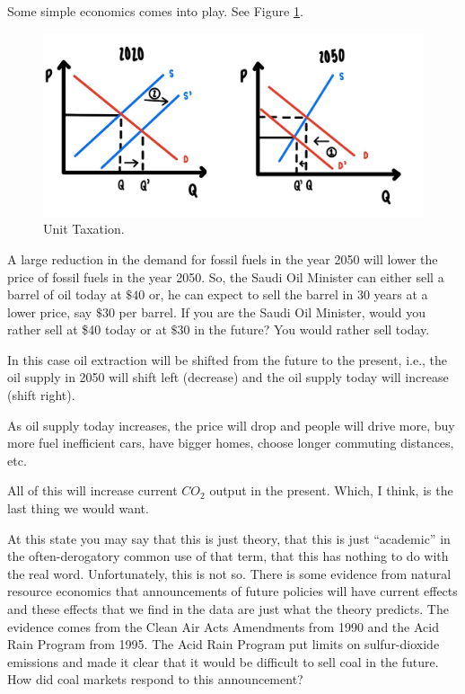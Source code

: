 \documentclass[
]{book}
\begin{document}
Some simple economics comes into play. See Figure \ref{fig:compmarkets08}.

\begin{figure}

{\centering \includegraphics[width=0.9\linewidth]{img/compmarkets/fig8} 

}

\caption{Unit Taxation.}\label{fig:compmarkets08}
\end{figure}

A large reduction in the demand for fossil fuels in the year 2050 will lower the price of fossil fuels in the year 2050. So, the Saudi Oil Minister can either sell a barrel of oil today at \(\$40\) or, he can expect to sell the barrel in 30 years at a lower price, say \(\$30\) per barrel. If you are the Saudi Oil Minister, would you rather sell at \$40 today or at \(\$30\) in the future?
You would rather sell today.

In this case oil extraction will be shifted from the future to the present, i.e., the oil supply in 2050 will shift left (decrease) and the oil supply today will increase (shift right).

As oil supply today increases, the price will drop and people will drive more, buy more fuel inefficient cars, have bigger homes, choose longer commuting distances, etc.

All of this will increase current \(CO_2\) output in the present. Which, I think, is the last thing we would want.

At this state you may say that this is just theory, that this is just ``academic'' in the often-derogatory common use of that term, that this has nothing to do with the real word. Unfortunately, this is not so. There is some evidence from natural resource economics that announcements of future policies will have current effects and these effects that we find in the data are just what the theory predicts. The evidence comes from the Clean Air Acts Amendments from 1990 and the Acid Rain Program from 1995. The Acid Rain Program put limits on sulfur-dioxide emissions and made it clear that it would be difficult to sell coal in the future. How did coal markets respond to this announcement?
\end{document}
